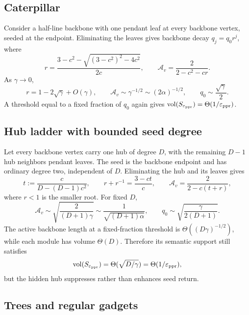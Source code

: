 \documentclass[11pt]{article}
\begin{document}
\subsection{Caterpillar}

Consider a half-line backbone with one pendant leaf at every backbone vertex,
seeded at the endpoint.  Eliminating the leaves gives backbone decay
$q_j=q_0r^j$, where
\begin{equation}
 r=\frac{3-c^2-\sqrt{(3-c^2)^2-4c^2}}{2c},
 \qquad
 \mathcal A_v=\frac{2}{2-c^2-cr}.
 \label{eq:bounded-return-caterpillar-formula}
\end{equation}
As $\gamma\to0$,
\begin{equation}
 r=1-2\sqrt\gamma+O(\gamma),
 \qquad
 \mathcal A_v\sim\gamma^{-1/2}\sim(2\alpha)^{-1/2},
 \qquad
 q_0\sim\frac{\sqrt\gamma}{2}.
 \label{eq:bounded-return-caterpillar-asymptotic}
\end{equation}
A threshold equal to a fixed fraction of $q_0$ again gives
$\operatorname{vol}(S_{\varepsilon_{\mathrm{ppr}}})=\Theta(1/\varepsilon_{\mathrm{ppr}})$.

\subsection{Hub ladder with bounded seed degree}

Let every backbone vertex carry one hub of degree $D$, with the remaining
$D-1$ hub neighbors pendant leaves.  The seed is the backbone endpoint and
has ordinary degree two, independent of $D$.  Eliminating the hub and its
leaves gives
\begin{equation}
 t:=\frac{c}{D-(D-1)c^2},
 \qquad
 r+r^{-1}=\frac{3-ct}{c},
 \qquad
 \mathcal A_v=\frac{2}{2-c(t+r)},
 \label{eq:bounded-return-hub-ladder-formula}
\end{equation}
where $r<1$ is the smaller root.  For fixed $D$,
\begin{equation}
 \mathcal A_v\sim\sqrt{\frac{2}{(D+1)\gamma}}
 \sim\frac{1}{\sqrt{(D+1)\alpha}},
 \qquad
 q_0\sim\sqrt{\frac{\gamma}{2(D+1)}}.
 \label{eq:bounded-return-hub-ladder-asymptotic}
\end{equation}
The active backbone length at a fixed-fraction threshold is
$\Theta((D\gamma)^{-1/2})$, while each module has volume $\Theta(D)$.
Therefore its semantic support still satisfies
\[
 \operatorname{vol}(S_{\varepsilon_{\mathrm{ppr}}})=\Theta(\sqrt{D/\gamma})
 =\Theta(1/\varepsilon_{\mathrm{ppr}}),
\]
but the hidden hub suppresses rather than enhances seed return.

\subsection{Trees and regular gadgets}
\end{document}
